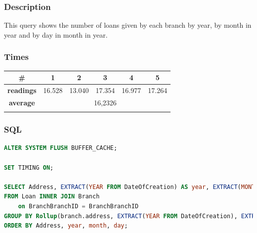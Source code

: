 \documentclass[a4paper, 10pt]{article}
\begin{document}
\subsubsection{Description}
This query shows the number of loans given by each branch by year, by month in year and by day in month in year.
\subsubsection{Times}
\begin{table}[H]
\centering
\begin{tabular}{cccccc}
\hline
\multicolumn{1}{|c|}{\textbf{\#}}       & \multicolumn{1}{c|}{\textbf{1}} & \multicolumn{1}{c|}{\textbf{2}} & \multicolumn{1}{c|}{\textbf{3}} & \multicolumn{1}{c|}{\textbf{4}} & \multicolumn{1}{c|}{\textbf{5}} \\ \hline
\multicolumn{1}{|c|}{\textbf{readings}} & \multicolumn{1}{c|}{16.528}           & \multicolumn{1}{c|}{13.040}           & \multicolumn{1}{c|}{17.354}           & \multicolumn{1}{c|}{16.977}           & \multicolumn{1}{c|}{17.264}           \\ \hline
\multicolumn{1}{|c|}{\textbf{average}}      & \multicolumn{5}{c|}{16,2326}                                                                                                                                                   \\ \hline
\textbf{}                               & \textbf{}                       & \textbf{}                       & \textbf{}                       & \textbf{}                       & \textbf{}                      
\end{tabular}
\end{table}
\subsubsection{SQL}
\begin{lstlisting}[language=SQL]
ALTER SYSTEM FLUSH BUFFER_CACHE;

SET TIMING ON;

SELECT Address, EXTRACT(YEAR FROM DateOfCreation) AS year, EXTRACT(MONTH FROM DateOfCreation) AS month, EXTRACT(DAY FROM DateOfCreation) AS day, Count(*) AS total
FROM Loan INNER JOIN Branch 
    on BranchBranchID = BranchBranchID
GROUP BY Rollup(branch.address, EXTRACT(YEAR FROM DateOfCreation), EXTRACT(MONTH FROM DateOfCreation), Extract(DAY FROM DateOfCreation))
ORDER BY Address, year, month, day;
\end{lstlisting}
\end{document}
